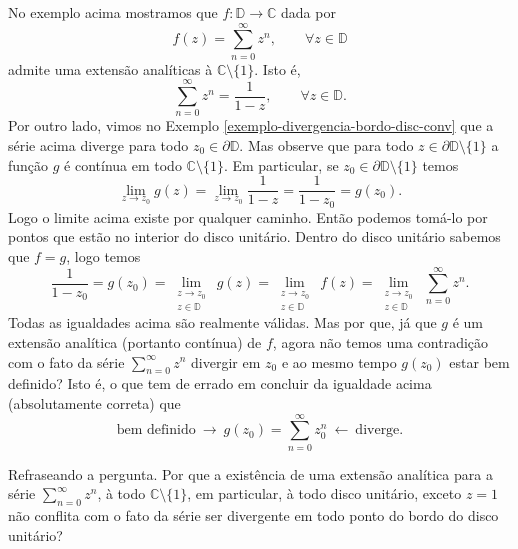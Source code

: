 \begin{observacao}
No exemplo acima mostramos que $f:\mathbb{D}\to\mathbb{C}$ dada por
\[
f(z) = \sum_{n=0}^{\infty} z^n, \qquad \forall z\in\mathbb{D}
\]
admite uma extensão analíticas à $\mathbb{C}\setminus\{1\}$.
Isto é, 
\[
\sum_{n=0}^{\infty} z^n = \frac{1}{1-z}, \qquad \forall z\in \mathbb{D}.
\]
Por outro lado, vimos no Exemplo \ref{exemplo-divergencia-bordo-disc-conv}
que a série acima diverge para todo $z_0\in \partial\mathbb{D}$. 
Mas observe que para todo 
$z\in \partial\mathbb{D}\setminus\{1\}$ a função $g$ é contínua em todo
$\mathbb{C}\setminus\{1\}$.
Em particular, se $z_0\in\partial\mathbb{D}\setminus\{1\}$ temos
\[
\lim_{z\to z_0}g(z) = \lim_{z\to z_0}\frac{1}{1-z} = \frac{1}{1-z_0}=g(z_0).
\]
Logo o limite acima existe por qualquer caminho. Então podemos tomá-lo
por pontos que estão no interior do disco unitário. 
Dentro do disco unitário sabemos que 
$f=g$, logo temos 
\[
\frac{1}{1-z_0}
=
g(z_0)
=
\lim_{ \substack{z\to z_0 \\ z\in\mathbb{D}\  }  }\ g(z)
=
\lim_{ \substack{z\to z_0 \\ z\in\mathbb{D}\  }  }\ f(z)
=
\lim_{ \substack{z\to z_0 \\ z\in\mathbb{D}\  }  }\ \sum_{n=0}^{\infty} z^n.
\]
Todas as igualdades acima são realmente válidas. 
Mas por que, já que $g$ é um extensão analítica (portanto contínua) de $f$,
agora não temos uma contradição com o fato da série $\sum_{n=0}^{\infty} z^n$
divergir em $z_0$ e ao mesmo tempo $g(z_0)$ estar bem definido? Isto é, 
o que tem de errado em concluir da igualdade acima (absolutamente correta) que
\[
\text{bem definido} \ \longrightarrow  \ g(z_0) = \sum_{n=0}^{\infty}z_0^n
\ \longleftarrow \ \text{diverge}. 
\]

Refraseando a pergunta. Por que a existência de uma extensão analítica para
a série $\sum_{n=0}^{\infty} z^n$, à todo $\mathbb{C}\setminus\{1\}$, em particular, 
à todo disco unitário, exceto $z=1$ não conflita com o fato da 
série ser divergente em todo ponto do bordo do disco unitário?
\end{observacao}
